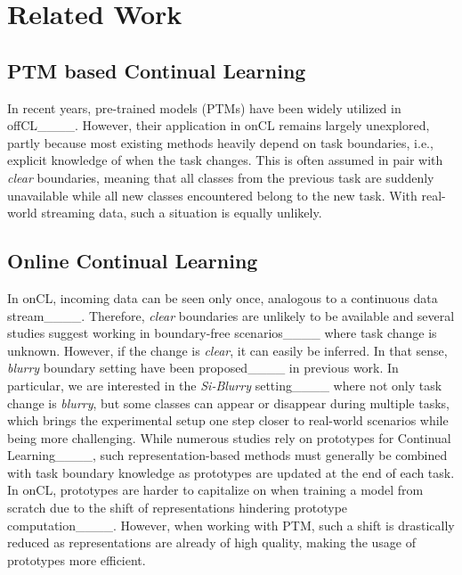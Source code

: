 \section{Related Work}
\label{sec:related}

\subsection{PTM based Continual Learning}
In recent years, pre-trained models (PTMs) have been widely utilized in offCL____. However, their application in onCL remains largely unexplored, partly because most existing methods heavily depend on task boundaries, i.e., explicit knowledge of when the task changes. This is often assumed in pair with \textit{clear} boundaries, meaning that all classes from the previous task are suddenly unavailable while all new classes encountered belong to the new task. With real-world streaming data, such a situation is equally unlikely.

\subsection{Online Continual Learning}
In onCL, incoming data can be seen only once, analogous to a continuous data stream____. Therefore, \textit{clear} boundaries are unlikely to be available and several studies suggest working in boundary-free scenarios____ where task change is unknown. However, if the change is \textit{clear}, it can easily be inferred. In that sense, \textit{blurry} boundary setting have been proposed____ in previous work. In particular, we are interested in the \textit{Si-Blurry} setting____ where not only task change is \textit{blurry}, but some classes can appear or disappear during multiple tasks, which brings the experimental setup one step closer to real-world scenarios while being more challenging. While numerous studies rely on prototypes for Continual Learning____, such representation-based methods must generally be combined with task boundary knowledge as prototypes are updated at the end of each task. In onCL, prototypes are harder to capitalize on when training a model from scratch due to the shift of representations hindering prototype computation____. However, when working with PTM, such a shift is drastically reduced as representations are already of high quality, making the usage of prototypes more efficient.

